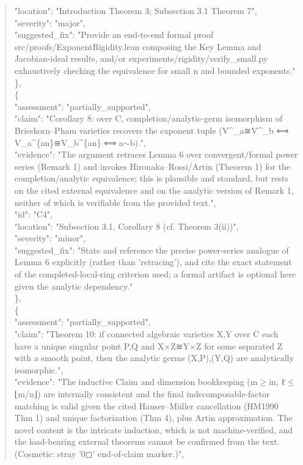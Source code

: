 \documentclass[11pt]{article}
\begin{document}
\begin{quote}
      "location": "Introduction Theorem 3; Subsection 3.1 Theorem 7",\\
      "severity": "major",\\
      "suggested\_fix": "Provide an end-to-end formal proof src/proofs/ExponentRigidity.lean composing the Key Lemma and Jacobian-ideal results, and/or experiments/rigidity/verify\_small.py exhaustively checking the equivalence for small n and bounded exponents."\\
    \},\\
    \{\\
      "assessment": "partially\_supported",\\
      "claim": "Corollary 8: over C, completion/analytic-germ isomorphism of Brieskorn--Pham varieties recovers the exponent tuple (V\^{}\_a≅V\^{}\_b ⟺ V\_a\^{}\{an\}≅V\_b\^{}\{an\} ⟺ a\ensuremath{\sim}b).",\\
      "evidence": "The argument retraces Lemma 6 over convergent/formal power series (Remark 1) and invokes Hironaka--Rossi/Artin (Theorem 1) for the completion/analytic equivalence; this is plausible and standard, but rests on the cited external equivalence and on the analytic version of Remark 1, neither of which is verifiable from the provided text.",\\
      "id": "C4",\\
      "location": "Subsection 3.1, Corollary 8 (cf. Theorem 3(ii))",\\
      "severity": "minor",\\
      "suggested\_fix": "State and reference the precise power-series analogue of Lemma 6 explicitly (rather than 'retracing'), and cite the exact statement of the completed-local-ring criterion used; a formal artifact is optional here given the analytic dependency."\\
    \},\\
    \{\\
      "assessment": "partially\_supported",\\
      "claim": "Theorem 10: if connected algebraic varieties X,Y over C each have a unique singular point P,Q and X\ensuremath{\times}Z≅Y\ensuremath{\times}Z for some separated Z with a smooth point, then the analytic germs (X,P),(Y,Q) are analytically isomorphic.",\\
      "evidence": "The inductive Claim and dimension bookkeeping (m\ensuremath{\ge}in, ℓ\ensuremath{\le}⌊m/n⌋) are internally consistent and the final indecomposable-factor matching is valid given the cited Hauser--Müller cancellation (HM1990 Thm 1) and unique factorization (Thm 4), plus Artin approximation. The novel content is the intricate induction, which is not machine-verified, and the load-bearing external theorems cannot be confirmed from the text. (Cosmetic: stray '0◻' end-of-claim marker.)",\\

\end{quote}
\end{document}
